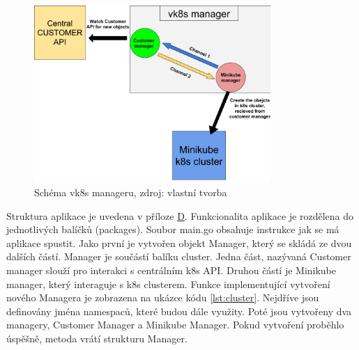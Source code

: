 \begin{figure}[H]
  \begin{centering}
    
	  \includegraphics[width=0.8\textwidth]{images/vk8s.png}
    \par
	  \caption{Schéma vk8s manageru\label{fig:vk8s}, zdroj: vlastní tvorba}
    \end{centering}
\end{figure}

    Struktura aplikace je uvedena v příloze \hyperref[app:struktura]{D}. Funkcionalita aplikace je \linebreak rozdělena do jednotlivých balíčků (packages). Soubor main.go obsahuje instrukce jak se má aplikace spustit. Jako první je vytvořen objekt Manager, který se skládá ze dvou dalších částí. Manager je součástí balíku cluster. Jedna část, nazývaná Customer manager slouží pro interakci s centrálním k8s API. Druhou částí je Minikube manager, který interaguje s k8s clusterem. Funkce implementující vytvoření nového Managera je zobrazena na ukázce kódu \ref{lst:cluster}. Nejdříve jsou definovány jména namespaců, které budou dále využity. Poté jsou vytvořeny dva managery, Customer Manager a Minikube Manager. Pokud vytvoření proběhlo úspěšně, metoda vrátí strukturu Manager. 

